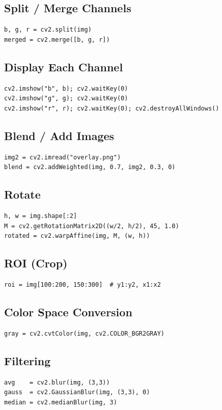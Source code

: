 \subsection*{Split / Merge Channels}
\begin{lstlisting}
b, g, r = cv2.split(img)
merged = cv2.merge([b, g, r])
\end{lstlisting}

\subsection*{Display Each Channel}
\begin{lstlisting}
cv2.imshow("b", b); cv2.waitKey(0)
cv2.imshow("g", g); cv2.waitKey(0)
cv2.imshow("r", r); cv2.waitKey(0); cv2.destroyAllWindows()
\end{lstlisting}

\subsection*{Blend / Add Images}
\begin{lstlisting}
img2 = cv2.imread("overlay.png")
blend = cv2.addWeighted(img, 0.7, img2, 0.3, 0)
\end{lstlisting}

\subsection*{Rotate}
\begin{lstlisting}
h, w = img.shape[:2]
M = cv2.getRotationMatrix2D((w/2, h/2), 45, 1.0)
rotated = cv2.warpAffine(img, M, (w, h))
\end{lstlisting}

\subsection*{ROI (Crop)}
\begin{lstlisting}
roi = img[100:200, 150:300]  # y1:y2, x1:x2
\end{lstlisting}

\subsection*{Color Space Conversion}
\begin{lstlisting}
gray = cv2.cvtColor(img, cv2.COLOR_BGR2GRAY)
\end{lstlisting}

\subsection*{Filtering}
\begin{lstlisting}
avg    = cv2.blur(img, (3,3))
gauss  = cv2.GaussianBlur(img, (3,3), 0)
median = cv2.medianBlur(img, 3)
\end{lstlisting}

